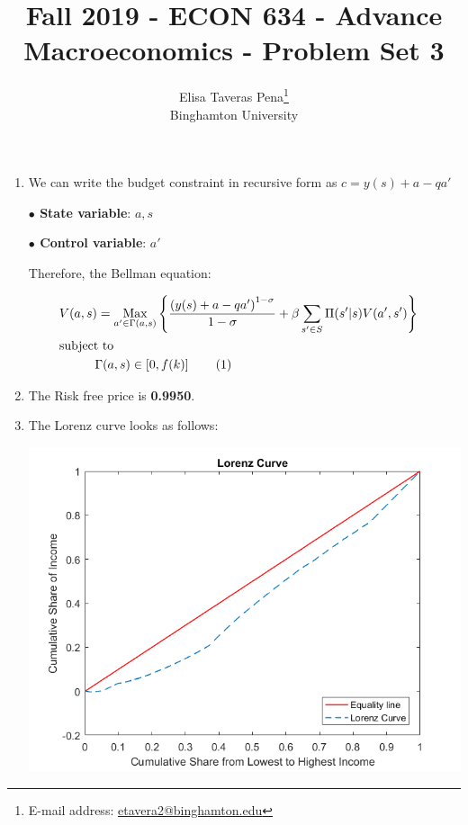 \documentclass[12pt]{article}%
\newcommand\tab[1][1cm]{\hspace*{#1}}
\DeclareMathOperator*{\Max}{Max}
\newcommand\numberthis{\addtocounter{equation}{1}\tag{\theequation}}
\begin{document}
\title{Fall 2019 - ECON 634 - Advance Macroeconomics - Problem Set 3}
\author{Elisa Taveras Pena\footnote{E-mail address: \href{mailto:etavera2@binghamton.edu}{etavera2@binghamton.edu}  }\\
Binghamton University}
\maketitle

\sloppy%

\onehalfspacing

\begin{enumerate}
	\item	We can write the budget constraint  in recursive form as  $c=y(s)+a -qa'$ 
	
	\tab \textbf{ $\bullet$ State variable}: $a,s$ 
	
	\tab \textbf{ $\bullet$ Control variable}: $a'$
	
	
	
	Therefore, the Bellman equation:
	
	\begin{align*}
	&V(a,s)=\Max_{a'\in \Gamma(a,s)} \left\lbrace \frac{\left( y(s)+a -qa'\right) ^{1-\sigma}}{1-\sigma}+ \beta \sum_{s' \in S} \Pi(s'|s)V(a',s')\right\rbrace 
	& \notag \\
	&\text{subject to} \notag \\
	& \tab \Gamma(a,s) \in \left[ 0,f(k)\right] \numberthis\\
	\end{align*} 
	
	\item The Risk free price is \textbf{0.9950}.
	
	\item The Lorenz curve looks as follows:
	
	\begin{center}
		\includegraphics[width=1\linewidth]{Lorenz}
	\end{center}
	

\end{enumerate}
\end{document}
